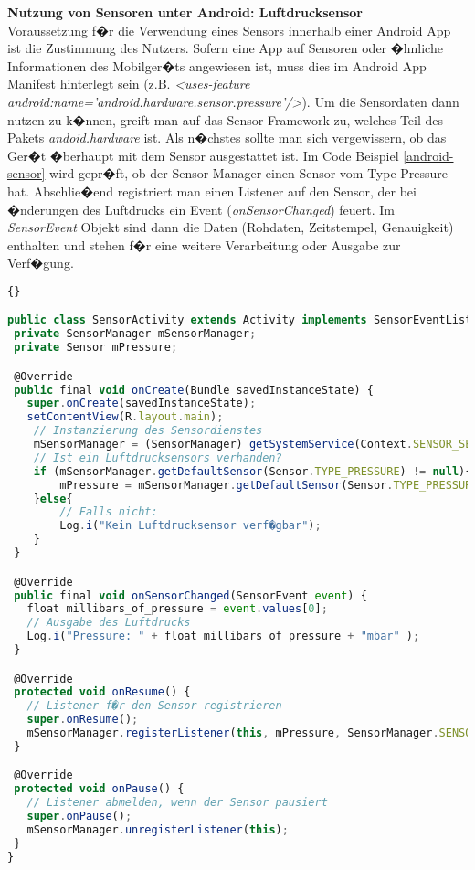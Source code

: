\begin{example}
\textbf{Nutzung von Sensoren unter Android: Luftdrucksensor}\\
Voraussetzung f�r die Verwendung eines Sensors innerhalb einer Android App ist die Zustimmung des Nutzers. Sofern eine App auf Sensoren oder �hnliche Informationen des Mobilger�ts angewiesen ist, muss dies im Android App Manifest hinterlegt sein (z.B. \emph{<uses-feature android:name='android.hardware.sensor.pressure'/>}).
Um die Sensordaten dann nutzen zu k�nnen, greift man auf das Sensor Framework zu, welches Teil des Pakets \emph{andoid.hardware} ist. Als n�chstes sollte man sich vergewissern, ob das Ger�t �berhaupt mit dem Sensor ausgestattet ist. Im Code Beispiel \ref{android-sensor} wird gepr�ft, ob der Sensor Manager einen Sensor vom Type Pressure hat. 
Abschlie�end registriert man einen Listener auf den Sensor, der bei �nderungen des Luftdrucks ein Event (\emph{onSensorChanged}) feuert. Im \emph{SensorEvent} Objekt sind dann die Daten (Rohdaten, Zeitstempel, Genauigkeit) enthalten und stehen f�r eine weitere Verarbeitung oder Ausgabe zur Verf�gung.


\begin{lstlisting}[caption={Ausgabe des Luftdrucks unter Android},label={android-sensor},language=Javascript,firstnumber=1,basicstyle=\tiny]{}

public class SensorActivity extends Activity implements SensorEventListener {
 private SensorManager mSensorManager;
 private Sensor mPressure;

 @Override
 public final void onCreate(Bundle savedInstanceState) {
   super.onCreate(savedInstanceState);
   setContentView(R.layout.main);
    // Instanzierung des Sensordienstes
    mSensorManager = (SensorManager) getSystemService(Context.SENSOR_SERVICE);
    // Ist ein Luftdrucksensors verhanden?
    if (mSensorManager.getDefaultSensor(Sensor.TYPE_PRESSURE) != null){
    	mPressure = mSensorManager.getDefaultSensor(Sensor.TYPE_PRESSURE);	
    }else{
    	// Falls nicht:
    	Log.i("Kein Luftdrucksensor verf�gbar");
    }
 }

 @Override
 public final void onSensorChanged(SensorEvent event) {
   float millibars_of_pressure = event.values[0];
   // Ausgabe des Luftdrucks
   Log.i("Pressure: " + float millibars_of_pressure + "mbar" );
 }

 @Override
 protected void onResume() {
   // Listener f�r den Sensor registrieren
   super.onResume();
   mSensorManager.registerListener(this, mPressure, SensorManager.SENSOR_DELAY_NORMAL);
 }

 @Override
 protected void onPause() {
   // Listener abmelden, wenn der Sensor pausiert
   super.onPause();
   mSensorManager.unregisterListener(this);
 }
}
\end{lstlisting}
\end{example}

